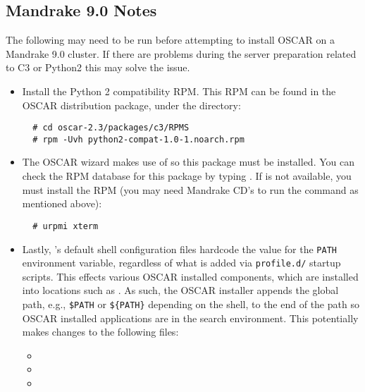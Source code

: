 \subsection{Mandrake 9.0 Notes}
\label{subsec:mdk90notes}

The following may need to be run before attempting to install OSCAR on a
Mandrake 9.0 cluster.  If there are problems during the server preparation
related to C3 or Python2 this may solve the issue.

\begin{itemize}
\item Install the Python 2 compatibility RPM.  This RPM can be found
  in the OSCAR distribution package, under the 
  directory:

\begin{verbatim}
  # cd oscar-2.3/packages/c3/RPMS
  # rpm -Uvh python2-compat-1.0-1.noarch.rpm
\end{verbatim}

\item The OSCAR wizard makes use of  so this package must be
  installed.  You can check the RPM database for this package by typing
  .  If  is not available, you must
  install the  RPM (you may need Mandrake 
  CD's to run the  command as mentioned above):

\begin{verbatim}
  # urpmi xterm
\end{verbatim}

\item Lastly, 's default shell configuration files hardcode the
  value for the {\tt PATH} environment variable, regardless of what is
  added via {\tt profile.d/} startup scripts.  This effects various
  OSCAR installed components, which are installed into locations such
  as .  As such, the OSCAR installer appends the global path,
  e.g., {\tt \$PATH} or {\tt \$\{PATH\}} depending on the shell, to the end
  of the path so OSCAR installed applications are in the search
  environment.  This potentially makes changes to the following files:

  \begin{itemize}
  \item {}
  \item {}
  \item {}
  \end{itemize}

\end{itemize}


